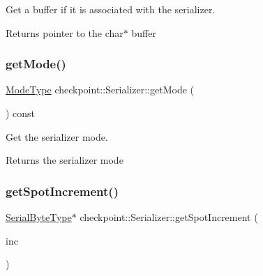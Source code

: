 Get a buffer if it is associated with the serializer. 

\begin{DoxyReturn}{Returns}
pointer to the {\ttfamily char$\ast$} buffer 
\end{DoxyReturn}
\mbox{\label{structcheckpoint_1_1_serializer_a2b22a87a81fb9ff1b00dd96bbe4debe2}} 
\subsubsection{\texorpdfstring{get\+Mode()}{getMode()}}
{\footnotesize\ttfamily \hyperlink{namespacecheckpoint_ae2509499ccd8b1dc48fb535bf8aa3059}{Mode\+Type} checkpoint\+::\+Serializer\+::get\+Mode (\begin{DoxyParamCaption}{ }\end{DoxyParamCaption}) const\hspace{0.3cm}{\ttfamily [inline]}}



Get the serializer mode. 

\begin{DoxyReturn}{Returns}
the serializer mode 
\end{DoxyReturn}
\mbox{\label{structcheckpoint_1_1_serializer_af2fc82901c31232b7549b20a8732de30}} 
\subsubsection{\texorpdfstring{get\+Spot\+Increment()}{getSpotIncrement()}}
{\footnotesize\ttfamily \hyperlink{namespacecheckpoint_ae57f01cdc0b81776c23b6c7c934c58f5}{Serial\+Byte\+Type}$\ast$ checkpoint\+::\+Serializer\+::get\+Spot\+Increment (\begin{DoxyParamCaption}\item[{\hyperlink{namespacecheckpoint_a083f6674da3f94c2901b18c6d238217c}{Serial\+Size\+Type} const}]{inc }\end{DoxyParamCaption})\hspace{0.3cm}{\ttfamily [inline]}}



